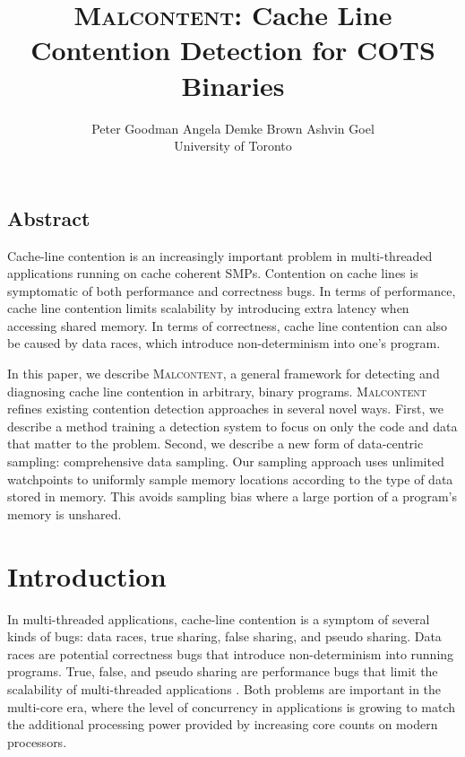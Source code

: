 \documentclass[letterpaper,twocolumn,10pt]{article}
\newcommand{\TextToolname}{Malcontent}
\newcommand{\Toolname}{\textsc{\TextToolname{}}}
\begin{document}
\date{}

\title{\Large \bf \Toolname: Cache Line Contention Detection for COTS Binaries}
\author{
{\rm Peter Goodman} \hspace{1.5em} {\rm Angela Demke Brown} \hspace{1.5em} {\rm Ashvin Goel}\\
University of Toronto
} %
\maketitle


\subsection*{Abstract}
Cache-line contention is an increasingly important problem in multi-threaded applications running on cache coherent SMPs.
Contention on cache lines is symptomatic of both performance and correctness bugs. In terms of performance, cache line
contention limits scalability by introducing extra latency when accessing shared memory.  In terms of correctness, cache
line contention can also be caused by data races, which introduce non-determinism into one's program.

In this paper, we describe \Toolname, a general framework for detecting and diagnosing cache line contention in arbitrary,
binary programs. \Toolname{} refines existing contention detection approaches in several novel ways. First, we describe a
method training a detection system to focus on only the code and data that matter to the problem. Second, we describe a
new form of data-centric sampling: comprehensive data sampling. Our sampling approach uses unlimited watchpoints to
uniformly sample memory locations according to the type of data stored in memory. This avoids sampling bias where a large
portion of a program's memory is unshared.

\section{Introduction}\label{sec:intro}

In multi-threaded applications, cache-line contention is a symptom of several kinds of bugs: data races, true sharing,
false sharing, and pseudo sharing. Data races are potential correctness bugs that introduce non-determinism into running
programs. True, false, and pseudo sharing are performance bugs that limit the scalability of multi-threaded applications
\cite{ImpactOfFalseSharing}. Both problems are important in the multi-core era, where the level of concurrency in
applications is growing to match the additional processing power provided by increasing core counts on modern processors.
\end{document}
